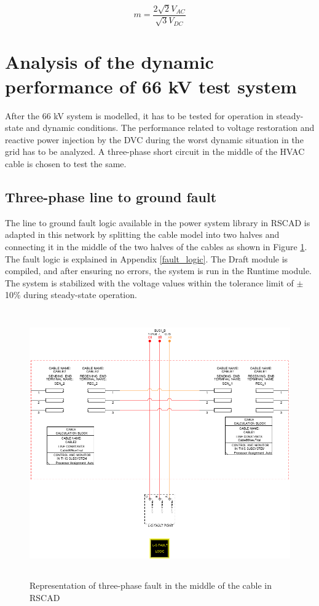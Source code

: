 \begin{equation}\label{MI_eq}
    m = \frac{2\sqrt{2} V_{AC}}{\sqrt{3} {V_{DC}}}
\end{equation}

\section{Analysis of the dynamic performance of 66 kV test system}
After the 66 kV system is modelled, it has to be tested for operation in steady-state and dynamic conditions. The performance related to voltage restoration and reactive power injection by the \gls{DVC} during the worst dynamic situation in the grid has to be analyzed. A three-phase short circuit in the middle of the \gls{HVAC} cable is chosen to test the same.

\subsection{Three-phase line to ground fault}

The line to ground fault logic available in the power system library in RSCAD is adapted in this network by splitting the cable model into two halves and connecting it in the middle of the two halves of the cables as shown in Figure \ref{fig:2cablesblockwithfault}. The fault logic is explained in Appendix \ref{fault_logic}. 
The Draft module is compiled, and after ensuring no errors, the system is run in the Runtime module. The system is stabilized with the voltage values within the tolerance limit of $\pm$ 10\% during steady-state operation.

\begin{figure}[H]
\centering
    \includegraphics[height = 11.5cm,width = 12.5cm]{Diagrams/Chapter_3/2CablesBlockWithFault.png}
    \caption{Representation of three-phase fault in the middle of the cable in RSCAD}
    \label{fig:2cablesblockwithfault}
\end{figure}

